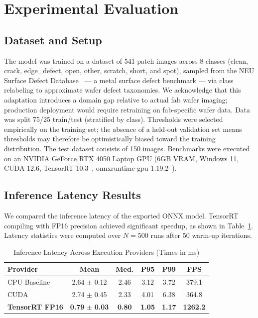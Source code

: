 \documentclass[conference]{IEEEtran}
\begin{document}
\section{Experimental Evaluation}

\subsection{Dataset and Setup}
The model was trained on a dataset of 541 patch images across 8 classes (clean, crack, edge\_defect, open, other, scratch, short, and spot), sampled from the NEU Surface Defect Database~\cite{song2020neu} --- a metal surface defect benchmark --- via class relabeling to approximate wafer defect taxonomies. We acknowledge that this adaptation introduces a domain gap relative to actual fab wafer imaging; production deployment would require retraining on fab-specific wafer data. Data was split 75/25 train/test (stratified by class). Thresholds were selected empirically on the training set; the absence of a held-out validation set means thresholds may therefore be optimistically biased toward the training distribution. The test dataset consists of 150 images. Benchmarks were executed on an NVIDIA GeForce RTX 4050 Laptop GPU (6GB VRAM, Windows 11, CUDA 12.6, TensorRT 10.3~\cite{tensorrt2023}, onnxruntime-gpu 1.19.2~\cite{onnxruntime}).

\subsection{Inference Latency Results}
We compared the inference latency of the exported ONNX model. TensorRT compiling with FP16 precision achieved significant speedup, as shown in Table~\ref{tab:inference_latency}. Latency statistics were computed over $N=500$ runs after 50 warm-up iterations.

\begin{table}[h]
\centering
\caption{Inference Latency Across Execution Providers (Times in ms)}
\label{tab:inference_latency}
\setlength{\tabcolsep}{4pt}
\footnotesize
\begin{tabular}{lccccc}
\toprule
\textbf{Provider} & \textbf{Mean} & \textbf{Med.} & \textbf{P95} & \textbf{P99} & \textbf{FPS} \\
\midrule
CPU Baseline & 2.64 $\pm$ 0.12 & 2.46 & 3.12 & 3.72 & 379.1 \\
CUDA & 2.74 $\pm$ 0.45 & 2.33 & 4.01 & 6.38 & 364.8 \\
\textbf{TensorRT FP16} & \textbf{0.79} $\pm$ \textbf{0.03} & \textbf{0.80} & \textbf{1.05} & \textbf{1.17} & \textbf{1262.2} \\
\bottomrule
\end{tabular}
\end{table}
\end{document}
